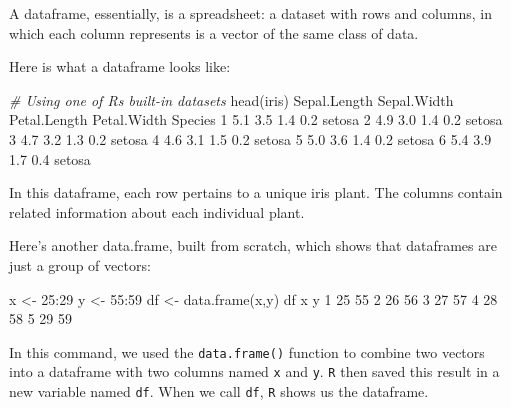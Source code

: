 \documentclass[
]{book}
\newenvironment{Shaded}{\begin{snugshade}}{\end{snugshade}}
\newcommand{\CommentTok}[1]{\textcolor[rgb]{0.56,0.35,0.01}{\textit{#1}}}
\newcommand{\DecValTok}[1]{\textcolor[rgb]{0.00,0.00,0.81}{#1}}
\newcommand{\FloatTok}[1]{\textcolor[rgb]{0.00,0.00,0.81}{#1}}
\newcommand{\FunctionTok}[1]{\textcolor[rgb]{0.00,0.00,0.00}{#1}}
\newcommand{\NormalTok}[1]{#1}
\newcommand{\OtherTok}[1]{\textcolor[rgb]{0.56,0.35,0.01}{#1}}
\newcommand{\SpecialCharTok}[1]{\textcolor[rgb]{0.00,0.00,0.00}{#1}}
\begin{document}
A dataframe, essentially, is a spreadsheet: a dataset with rows and columns, in which each column represents is a vector of the same class of data.

Here is what a dataframe looks like:

\begin{Shaded}
\begin{Highlighting}[]
\CommentTok{\# Using one of R\textquotesingle{}s built{-}in datasets}
\FunctionTok{head}\NormalTok{(iris)}
\NormalTok{  Sepal.Length Sepal.Width Petal.Length Petal.Width Species}
\DecValTok{1}          \FloatTok{5.1}         \FloatTok{3.5}          \FloatTok{1.4}         \FloatTok{0.2}\NormalTok{  setosa}
\DecValTok{2}          \FloatTok{4.9}         \FloatTok{3.0}          \FloatTok{1.4}         \FloatTok{0.2}\NormalTok{  setosa}
\DecValTok{3}          \FloatTok{4.7}         \FloatTok{3.2}          \FloatTok{1.3}         \FloatTok{0.2}\NormalTok{  setosa}
\DecValTok{4}          \FloatTok{4.6}         \FloatTok{3.1}          \FloatTok{1.5}         \FloatTok{0.2}\NormalTok{  setosa}
\DecValTok{5}          \FloatTok{5.0}         \FloatTok{3.6}          \FloatTok{1.4}         \FloatTok{0.2}\NormalTok{  setosa}
\DecValTok{6}          \FloatTok{5.4}         \FloatTok{3.9}          \FloatTok{1.7}         \FloatTok{0.4}\NormalTok{  setosa}
\end{Highlighting}
\end{Shaded}

In this dataframe, each row pertains to a unique iris plant. The columns contain related information about each individual plant.

Here's another data.frame, built from scratch, which shows that dataframes are just a group of vectors:

\begin{Shaded}
\begin{Highlighting}[]
\NormalTok{x }\OtherTok{\textless{}{-}} \DecValTok{25}\SpecialCharTok{:}\DecValTok{29}
\NormalTok{y }\OtherTok{\textless{}{-}} \DecValTok{55}\SpecialCharTok{:}\DecValTok{59}
\NormalTok{df }\OtherTok{\textless{}{-}} \FunctionTok{data.frame}\NormalTok{(x,y)}
\NormalTok{df}
\NormalTok{   x  y}
\DecValTok{1} \DecValTok{25} \DecValTok{55}
\DecValTok{2} \DecValTok{26} \DecValTok{56}
\DecValTok{3} \DecValTok{27} \DecValTok{57}
\DecValTok{4} \DecValTok{28} \DecValTok{58}
\DecValTok{5} \DecValTok{29} \DecValTok{59}
\end{Highlighting}
\end{Shaded}

In this command, we used the \texttt{data.frame()} function to combine two vectors into a dataframe with two columns named \texttt{x} and \texttt{y}. \texttt{R} then saved this result in a new variable named \texttt{df}. When we call \texttt{df}, \texttt{R} shows us the dataframe.
\end{document}
